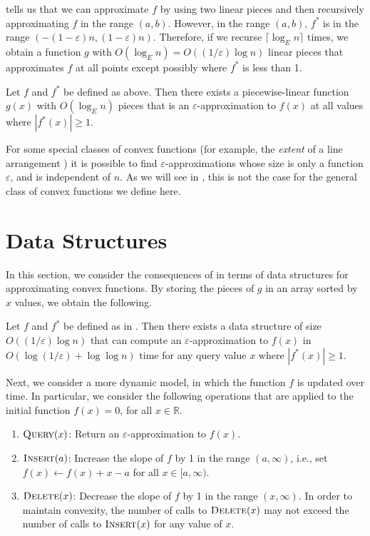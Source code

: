 \documentclass[charterfonts,lotsofwhite]{patmorin}
\newcommand{\eps}{\varepsilon}
\newcommand{\Real}{\mathbb{R}}
\begin{document}
 tells us that we can approximate $f$ by using two
linear pieces and then recursively approximating $f$ in the range
$(a,b)$.  However, in the range $(a,b)$, $f^*$ is in the range
$(-(1-\eps)n, (1-\eps)n)$.  Therefore, if we recurse $\lceil \log_E
n\rceil$ times, we obtain a function $g$ with $O(\log_E n) =
O((1/\eps) \log n)$ linear pieces that approximates $f$ at all points
except possibly where $f^*$ is less than 1.

\begin{thm}
Let $f$ and $f^*$ be defined as above.  Then there exists a piecewise-linear
function $g(x)$ with $O(\log_E n)$ pieces that is an
$\eps$-approximation to $f(x)$ at all values where $|f^*(x)|\ge 1$.
\end{thm}

For some special classes of convex functions (for example, the
\emph{extent} of a line arrangement \cite{ah01}) it is possible to
find $\eps$-approximations whose size is only a function $\eps$, and
is independent of $n$.  As we will see in , this is
not the case for the general class of convex functions we define here.

\section{Data Structures}

In this section, we consider the consequences of  in
terms of data structures for approximating convex functions.  By
storing the pieces of $g$ in an array sorted by $x$ values, we obtain
the following.

\begin{thm}
Let $f$ and $f^*$ be defined as in .  Then there exists
a data structure of size $O((1/\eps) \log n)$ that can compute an
$\eps$-approximation to $f(x)$ in $O(\log (1/\eps) + \log \log n)$
time for any query value $x$ where $|f^*(x)|\ge 1$.
\end{thm}

Next, we consider a more dynamic model, in which the function $f$ is
updated over time.  In particular, we consider the following
operations that are applied to the initial function $f(x)=0$, for all
$x\in\Real$.

\begin{enumerate}
\item $\textsc{Query}(x)$: Return an $\eps$-approximation to
  $f(x)$.

\item $\textsc{Insert}(a)$: Increase the slope of $f$ by 1 in the
  range $(a,\infty)$, i.e., set $f(x)\gets f(x)+x-a$ for all $x\in
  [a,\infty)$.

\item $\textsc{Delete}(x)$: Decrease the slope of $f$ by 1 in the
  range $(x,\infty)$.  In order to maintain convexity, the number of
  calls to $\textsc{Delete}(x)$ may not exceed the number of calls to
  $\textsc{Insert}(x)$ for any value of $x$.
\end{enumerate}
\end{document}
